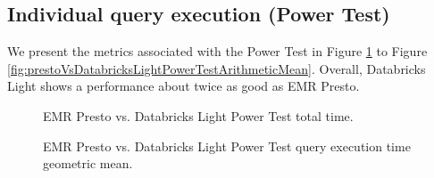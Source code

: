 \subsection{Individual query execution (Power Test)}

We present the metrics associated with the Power Test in Figure \ref{fig:prestoVsDatabricksLightPowerTestTotalTime} to Figure \ref{fig:prestoVsDatabricksLightPowerTestArithmeticMean}. Overall, Databricks Light shows a performance about twice as good as EMR Presto.

\begin{figure}
   \begin{center}
   \end{center}
   \caption{EMR Presto vs. Databricks Light Power Test total time.}
   \label{fig:prestoVsDatabricksLightPowerTestTotalTime}
\end{figure}

\begin{figure}
   \begin{center}
   \end{center}
   \caption{EMR Presto vs. Databricks Light Power Test query execution time geometric mean.}
   \label{fig:prestoVsDatabricksLightPowerTestGeomean}
\end{figure}

